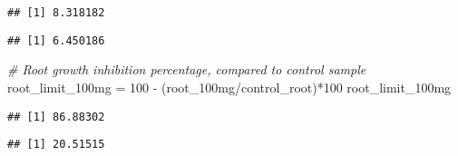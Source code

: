 \documentclass[
]{article}
\newenvironment{Shaded}{\begin{snugshade}}{\end{snugshade}}
\newcommand{\CommentTok}[1]{\textcolor[rgb]{0.56,0.35,0.01}{\textit{#1}}}
\newcommand{\DecValTok}[1]{\textcolor[rgb]{0.00,0.00,0.81}{#1}}
\newcommand{\FunctionTok}[1]{\textcolor[rgb]{0.00,0.00,0.00}{#1}}
\newcommand{\NormalTok}[1]{#1}
\newcommand{\OtherTok}[1]{\textcolor[rgb]{0.56,0.35,0.01}{#1}}
\newcommand{\SpecialCharTok}[1]{\textcolor[rgb]{0.00,0.00,0.00}{#1}}
\begin{document}
\begin{Shaded}
\end{Shaded}

\begin{verbatim}
## [1] 8.318182
\end{verbatim}

\begin{Shaded}
\end{Shaded}

\begin{verbatim}
## [1] 6.450186
\end{verbatim}

\begin{Shaded}
\begin{Highlighting}[]
\CommentTok{\# Root growth inhibition percentage, compared to control sample}
\NormalTok{root\_limit\_100mg }\OtherTok{=} \DecValTok{100} \SpecialCharTok{{-}}\NormalTok{ (root\_100mg}\SpecialCharTok{/}\NormalTok{control\_root)}\SpecialCharTok{*}\DecValTok{100}
\NormalTok{root\_limit\_100mg}
\end{Highlighting}
\end{Shaded}

\begin{verbatim}
## [1] 86.88302
\end{verbatim}

\begin{Shaded}
\end{Shaded}

\begin{verbatim}
## [1] 20.51515
\end{verbatim}

\begin{Shaded}
\end{Shaded}
\end{document}
